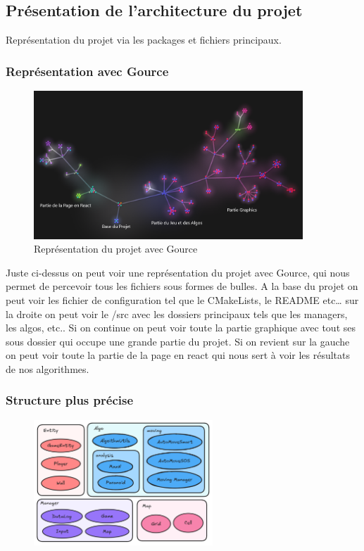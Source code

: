 \subsection{Présentation de l'architecture du projet}
Représentation du projet via les packages et fichiers principaux.

\subsubsection{Représentation avec Gource}
\begin{figure}[h]
	\centering
	\includegraphics[width=0.9\textwidth]{images/GourceScreen.png}
	\caption{Représentation du projet avec Gource}
	\label{GourceScreen}
\end{figure}
Juste ci-dessus on peut voir une représentation du projet avec Gource, qui nous permet de percevoir tous les fichiers sous formes de bulles. A la base du projet on peut voir les fichier de configuration tel que le CMakeLists, le README etc… sur la droite on peut voir le /src avec les dossiers principaux tels que les managers, les algos, etc.. Si on continue on peut voir toute la partie graphique avec tout ses sous dossier qui occupe une grande partie du projet. Si on revient sur la gauche on peut voir toute la partie de la page en react qui nous sert à voir les résultats de nos algorithmes.

\newpage

\subsubsection{Structure plus précise}
\begin{figure}
	\centering
	\includegraphics[width=0.6\textwidth]{images/ExcalidrawBase.png}
\end{figure}

